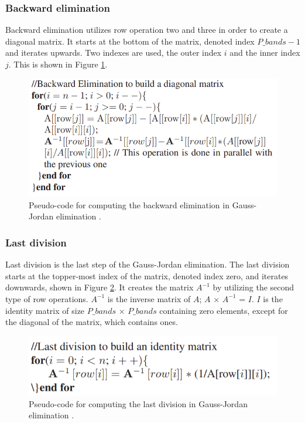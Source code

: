 \subsubsection{Backward elimination}
Backward elimination utilizes row operation two and three in order to create a diagonal matrix. It starts at the bottom of the matrix, denoted index $P\_bands-1$ and iterates upwards. Two indexes are used, the outer index $i$ and the inner index $j$. This is shown in Figure \ref{fig:backward_elimination_pseudocode}.

\begin{figure}[H]
\centering
   \includegraphics[scale=0.5]{images/backward_elimination_pseudocode.png}
  \caption{ Pseudo-code for computing the backward elimination in Gauss-Jordan elimination \cite{gauss_jordan_fpga}. } 
  \label{fig:backward_elimination_pseudocode}
\end{figure}


\subsubsection{Last division}
Last division is the last step of the Gauss-Jordan elimination. The last division starts at the topper-most index of the matrix, denoted index zero, and iterates downwards, shown in Figure \ref{fig:last_division_pseudocode}. It creates the matrix $A^{-1}$ by utilizing the second type of row operations. $A^{-1}$ is the inverse matrix of $A$; $A$ $\times$ $A^{-1}$ = $I$. $I$ is the identity matrix of size $P\_bands$ $\times$ $P\_bands$ containing zero elements, except for the diagonal of the matrix, which contains ones. 
\begin{figure}[H]
\centering
   \includegraphics[scale=0.5]{images/last_division_pseudocode.png}
  \caption{ Pseudo-code for computing the last division in Gauss-Jordan elimination \cite{gauss_jordan_fpga}. } 
  \label{fig:last_division_pseudocode}
\end{figure}

